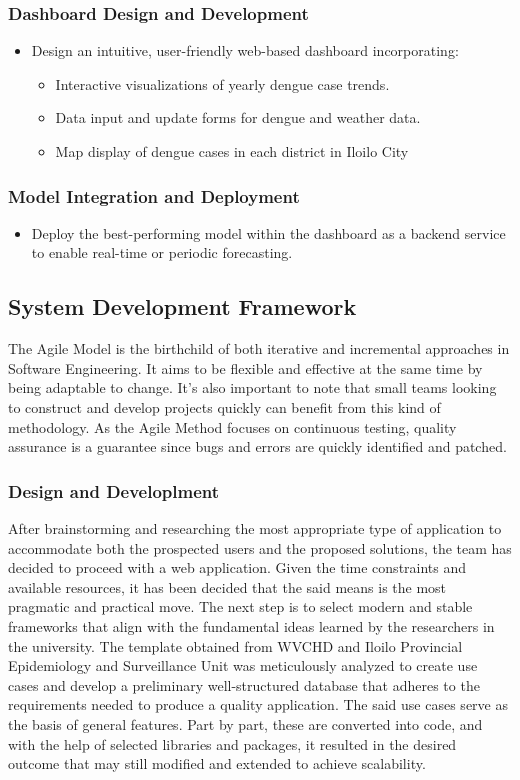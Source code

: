 \subsubsection{Dashboard Design and Development}
\begin{itemize}
	\item Design an intuitive, user-friendly web-based dashboard incorporating:
	\begin{itemize}
		\item Interactive visualizations of yearly dengue case trends.
		\item Data input and update forms for dengue and weather data.
		\item Map display of dengue cases in each district in Iloilo City
	\end{itemize}
\end{itemize}

\subsubsection{Model Integration and Deployment}
\begin{itemize}
	\item Deploy the best-performing model within the dashboard as a backend service to enable real-time or periodic forecasting.
\end{itemize}


\subsection{System Development Framework}
The Agile Model is the birthchild of both iterative and incremental approaches in Software Engineering. It aims to be flexible and effective at the same time by being adaptable to change. It's also important to note that small teams looking to construct and develop projects quickly can benefit from this kind of methodology. As the Agile Method focuses on continuous testing, quality assurance is a guarantee since bugs and errors are quickly identified and patched. 

\subsubsection{Design and Developlment}
After brainstorming and researching the most appropriate type of application to accommodate both the prospected users and the proposed solutions, the team has decided to proceed with a web application. Given the time constraints and available resources, it has been decided that the said means is the most pragmatic and practical move. The next step is to select modern and stable frameworks that align with the fundamental ideas learned by the researchers in the university. The template obtained from WVCHD and Iloilo Provincial Epidemiology and Surveillance Unit was meticulously analyzed to create use cases and develop a preliminary well-structured database that adheres to the requirements needed to produce a quality application. The said use cases serve as the basis of general features. Part by part, these are converted into code, and with the help of selected libraries and packages, it resulted in the desired outcome that may still modified and extended to achieve scalability. 

